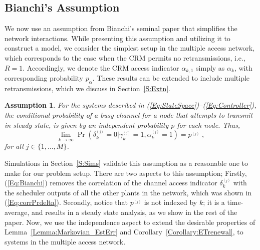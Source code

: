 \documentclass[journal]{IEEEtran}
\newtheorem{assumption}{Assumption}[section]
\begin{document}
\subsection{Bianchi's Assumption} \label{S:BianchiAssumption}

We now use an assumption from Bianchi's seminal paper \cite{Bianchi2000} that simplifies the network interactions. While presenting this assumption and utilizing it to construct a model, we consider the simplest setup in the multiple access network, which corresponds to the case when the CRM permits no retransmissions, i.e., $R=1$. Accordingly, we denote the CRM access indicator $\alpha_{k,1}$ simply as $\alpha_k$, with corresponding probability $p_{\alpha}$. These results can be extended to include multiple retransmissions, which we discuss in Section~\ref{S:Extn}.

\begin{assumption} \label{Assumption:Bianchi}
For the systems described in (\ref{Eq:StateSpace})--(\ref{Eq:Controller}), the conditional probability of a busy channel for a node that attempts to transmit in steady state, is given by an independent probability $p$ for each node. Thus,
\begin{equation} \label{Eq:Bianchi}
\lim_{k \to \infty} \Pr(\delta^{_{(j)}}_k=0|\gamma^{_{(j)}}_k=1,\alpha^{_{(j)}}_{k}=1) = p^{_{(j)}} \; ,
\end{equation}
for all $j \in \{1,\dots,M\}$.
\end{assumption}

Simulations in Section~\ref{S:Sims} validate this assumption as a reasonable one to make for our problem setup. There are two aspects to this assumption; Firstly, (\ref{Eq:Bianchi}) removes the correlation of the channel access indicator $\delta^{_{(j)}}_{k}$ with the scheduler outputs of all the other plants in the network, which was shown in (\ref{Eq:corrPrdelta}). Secondly, notice that $p^{_{(j)}}$ is not indexed by $k$; it is a time-average, and results in a steady state analysis, as we show in the rest of the paper. Now, we use the independence aspect to extend the desirable properties of Lemma~\ref{Lemma:Markovian_EstErr} and Corollary~\ref{Corollary:ETrenewal}, to systems in the multiple access network.
\end{document}
